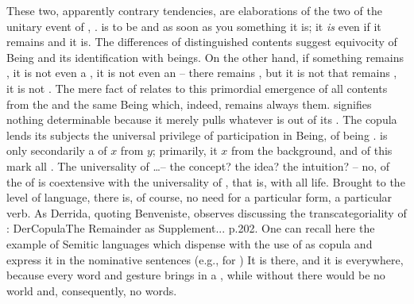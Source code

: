 These two, apparently contrary tendencies, are elaborations of the two
 of the unitary event of , .
 is to be  and as soon as you 
something it is; it {\em is} even if it remains  and 
 it is. The differences of distinguished contents suggest equivocity
of Being and its identification with beings. On the other hand, if something
remains , it is not even a , it is not even
an  -- there remains , but it is not  that
remains , it is not . The mere fact of
 relates to this primordial emergence of all contents from the
 and the same Being which, indeed, remains always 
them.
%
\label{pa:univocity}  signifies nothing determinable because it
merely pulls whatever is  out of its 
. The copula lends its subjects the universal privilege of
participation in Being, of being .   is only
secondarily a  of $x$ from $y$; primarily, it
 $x$ from the  background, and  of
this  mark all .  The universality of \ldots -- the
concept?  the idea?  the intuition?  -- no, of the  of  is coextensive with the universality of , that is, with
all life.  Brought to the level of language, there is, of course, no need for a
particular form, a particular verb.  As Derrida, quoting Benveniste, observes
discussing the transcategoriality of : \citet{the strangeness is in
  the facts -- that the verb of existence, out of all verbs, has this privilege
  of being present in an utterance in which it does not appear.}{DerCopula}{The
  Remainder as Supplement... p.202. One can recall here the example of Semitic
  languages which dispense with the use of  as copula and express it
  in the nominative sentences (e.g.,  for )\label{ftnt:nominative}} It is there, and it is
everywhere, because every word and gesture brings in a , while
without  there would be no world and, consequently, no words.


